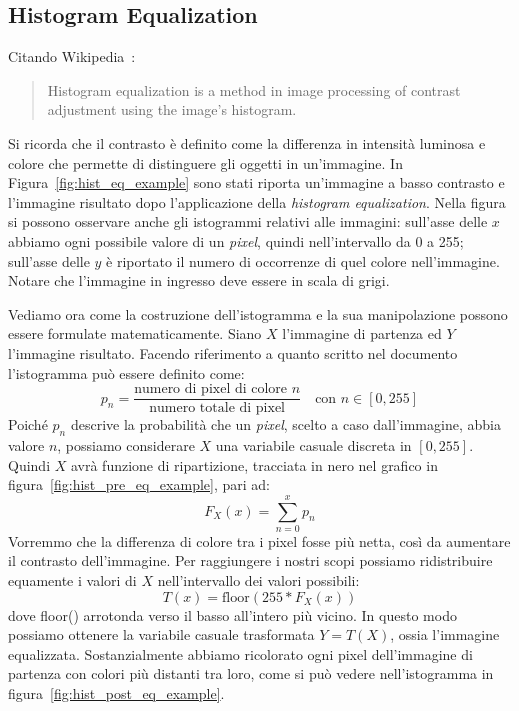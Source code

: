 \subsection {Histogram Equalization}
Citando Wikipedia~\cite{wikipedia-hist-eq}:
\begin{quote}
Histogram equalization is a method in image processing of contrast adjustment using the image's histogram.
\end{quote}
Si ricorda che il contrasto è definito come la differenza in intensità luminosa e colore che permette di distinguere gli oggetti in un'immagine.
In Figura~\ref{fig:hist_eq_example} sono stati riporta un'immagine a basso contrasto e l'immagine risultato dopo l'applicazione della \textit{histogram equalization}.
Nella figura si possono osservare anche gli istogrammi relativi alle immagini: sull'asse delle $x$ abbiamo ogni possibile valore di un \textit{pixel}, quindi nell'intervallo da 0 a 255; sull'asse delle $y$ è riportato il numero di occorrenze di quel colore nell'immagine.
Notare che l'immagine in ingresso deve essere in scala di grigi.

Vediamo ora come la costruzione dell'istogramma e la sua manipolazione possono essere formulate matematicamente.
Siano $X$ l'immagine di partenza ed $Y$ l'immagine risultato.
Facendo riferimento a quanto scritto nel documento~\cite{hist-eq} l'istogramma può essere definito come:
\begin{equation*}
p_n = \frac{\text{numero di pixel di colore $n$}}{\text{numero totale di pixel}} \quad \text{con $n$} \in [0,255]
\end{equation*}
Poiché $p_n$ descrive la probabilità che un \textit{pixel}, scelto a caso dall'immagine, abbia valore $n$, possiamo considerare $X$ una variabile casuale discreta in $[0,255]$.
Quindi $X$ avrà funzione di ripartizione, tracciata in nero nel grafico in figura~\ref{fig:hist_pre_eq_example}, pari ad:
\begin{equation*}
  F_X(x) = \sum_{n=0}^{x} p_n
\end{equation*}
Vorremmo che la differenza di colore tra i pixel fosse più netta, così da aumentare il contrasto dell'immagine.
Per raggiungere i nostri scopi possiamo ridistribuire equamente i valori di $X$ nell'intervallo dei valori possibili:
\begin{equation*}
  T(x) = \text{floor}(255 * F_X(x))
\end{equation*}
dove floor() arrotonda verso il basso all'intero più vicino.
In questo modo possiamo ottenere la variabile casuale trasformata $Y=T(X)$, ossia l'immagine equalizzata.
Sostanzialmente abbiamo ricolorato ogni pixel dell'immagine di partenza con colori più distanti tra loro, come si può vedere nell'istogramma in figura~\ref{fig:hist_post_eq_example}.

